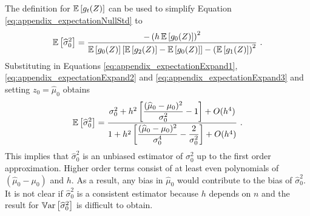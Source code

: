 The definition for $\operatorname{\mathbb{E}}\left[g_t(Z)\right]$ can be used to simplify Equation \ref{eq:appendix_expectationNullStd} to
\begin{equation}
  \operatorname{\mathbb{E}}\left[\widehat{\sigma}_0^{2}\right]
  =
  \dfrac{
    -\left(h\operatorname{\mathbb{E}}\left[g_0(Z)\right]\right)^2
  }
  {
    \operatorname{\mathbb{E}}\left[g_0(Z)\right]\left[
      \operatorname{\mathbb{E}}\left[g_2(Z)\right] - \operatorname{\mathbb{E}}\left[g_0(Z)\right]
    \right]
    - \left(\operatorname{\mathbb{E}}\left[g_1(Z)\right]\right)^2
  }
  \ .
\end{equation}
Substituting in Equations \ref{eq:appendix_expectationExpand1}, \ref{eq:appendix_expectationExpand2} and \ref{eq:appendix_expectationExpand3}  and setting $z_0 = \widehat{\mu}_0$ obtains
\begin{equation}
\operatorname{\mathbb{E}}\left[\widehat{\sigma}_0^{2}\right]
=
\dfrac{
  \sigma_0^2+h^2\left[\dfrac{(\widehat{\mu}_0-\mu_0)^2}{\sigma_0^2}-1\right]
  +O(h^4)
}
{
  1 + h^2\left[\dfrac{(\widehat{\mu}_0-\mu_0)^2}{\sigma_0^4}-\dfrac{2}{\sigma_0^2}\right]
  +O(h^4)
}
\ .
\end{equation}
This implies that $\widehat{\sigma}_0^{2}$ is an unbiased estimator of $\sigma_0^{2}$ up to the first order approximation. Higher order terms consist of at least even polynomials of $(\widehat{\mu}_0-\mu_0)$ and $h$. As a result, any bias in $\widehat{\mu}_0$ would contribute to the bias of $\widehat{\sigma}_0^{2}$. It is not clear if $\widehat{\sigma}_0^{2}$ is a consistent estimator because $h$ depends on $n$ and the result for $\operatorname{\mathbb{V}ar}\left[\widehat{\sigma}_0^{2}\right]$ is difficult to obtain.